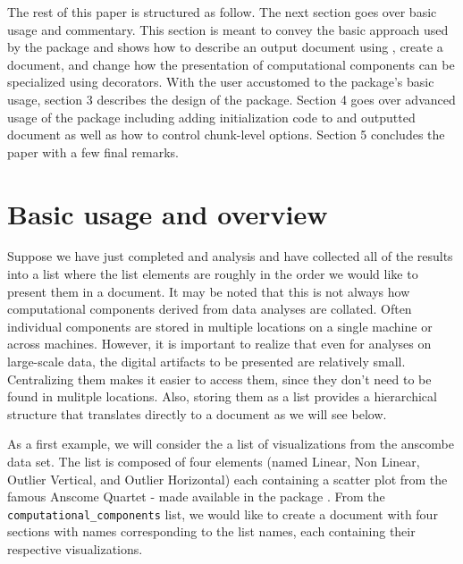 \documentclass[
]{jss}
\begin{document}
The rest of this paper is structured as follow. The next section goes
over basic usage and commentary. This section is meant to convey the
basic approach used by the package and shows how to describe an output
document using , create a document, and change how the
presentation of computational components can be specialized using
 decorators. With the user accustomed to the package's
basic usage, section 3 describes the design of the package. Section 4
goes over advanced usage of the package including adding initialization
code to and outputted document as well as how to control chunk-level
options. Section 5 concludes the paper with a few final remarks.

\hypertarget{basic-usage-and-overview}{%
\section{Basic usage and overview}\label{basic-usage-and-overview}}

Suppose we have just completed and analysis and have collected all of
the results into a list where the list elements are roughly in the order
we would like to present them in a document. It may be noted that this
is not always how computational components derived from data analyses
are collated. Often individual components are stored in multiple
locations on a single machine or across machines. However, it is
important to realize that even for analyses on large-scale data, the
digital artifacts to be presented are relatively small. Centralizing
them makes it easier to access them, since they don't need to be found
in mulitple locations. Also, storing them as a list provides a
hierarchical structure that translates directly to a document as we will
see below.

As a first example, we will consider the a list of visualizations from
the anscombe data set. The list is composed of four 
\citep{wickham2016}elements (named Linear, Non Linear, Outlier Vertical,
and Outlier Horizontal) each containing a scatter plot from the famous
Anscome Quartet - made available in the  package
\citep{R}. From the \texttt{computational\_components} list, we would
like to create a document with four sections with names corresponding to
the list names, each containing their respective visualizations.
\end{document}
